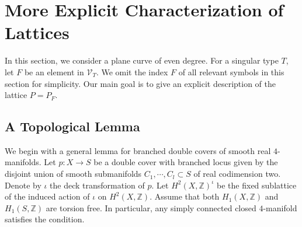 \documentclass[12pt,reqno,a4paper]{amsart}
\theoremstyle{remark}
\theoremstyle{definition}
\begin{document}
\section{More Explicit Characterization of Lattices}
\label{section: explicit description of lattices}
In this section, we consider a plane curve of even degree.
For a singular type $T$, let $F$ be an element in $\mathcal{V}_T$. 
We omit the index $F$ of all relevant symbols in this section for simplicity. 
Our main goal is to give an explicit description of the lattice $P=P_F$.

\subsection{A Topological Lemma}
We begin with a general lemma for branched double covers of smooth real $4$-manifolds.
Let $p\colon X\to S$ be a double cover with branched locus given by the disjoint union of smooth submanifolds $C_1,\cdots,C_l \subset S$ of real codimension two.
Denote by $\iota$ the deck transformation of $p$. 
Let $H^2(X,\mathbb{Z})^\iota$ be the fixed sublattice of the induced action of $\iota$ on $H^2(X,\mathbb{Z})$.
Assume that both $H_1(X,\mathbb{Z})$ and $H_1(S,\mathbb{Z})$ are torsion free.
In particular, any simply connected closed $4$-manifold satisfies the condition.
\end{document}
